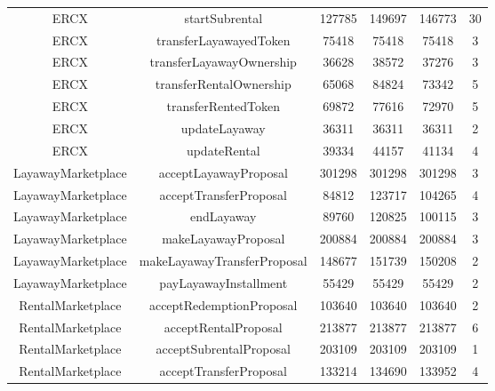 \documentclass[english, LaM, oneside]{sapthesis}%
\begin{document}
\begin{table}
\begin{adjustbox}{width=0.75\textwidth}
\begin{tabular}{@{}cccccc@{}}
ERCX               & startSubrental               & 127785       & 149697       & 146773       & 30               \\
ERCX               & transferLayawayedToken       & 75418        & 75418        & 75418        & 3                \\
ERCX               & transferLayawayOwnership     & 36628        & 38572        & 37276        & 3                \\
ERCX               & transferRentalOwnership      & 65068        & 84824        & 73342        & 5                \\
ERCX               & transferRentedToken          & 69872        & 77616        & 72970        & 5                \\
ERCX               & updateLayaway                & 36311        & 36311        & 36311        & 2                \\
ERCX               & updateRental                 & 39334        & 44157        & 41134        & 4                \\
LayawayMarketplace & acceptLayawayProposal        & 301298       & 301298       & 301298       & 3                \\
LayawayMarketplace & acceptTransferProposal       & 84812        & 123717       & 104265       & 4                \\
LayawayMarketplace & endLayaway                   & 89760        & 120825       & 100115       & 3                \\
LayawayMarketplace & makeLayawayProposal          & 200884       & 200884       & 200884       & 3                \\
LayawayMarketplace & makeLayawayTransferProposal  & 148677       & 151739       & 150208       & 2                \\
LayawayMarketplace & payLayawayInstallment        & 55429        & 55429        & 55429        & 2                \\
RentalMarketplace  & acceptRedemptionProposal     & 103640       & 103640       & 103640       & 2                \\
RentalMarketplace  & acceptRentalProposal         & 213877       & 213877       & 213877       & 6                \\
RentalMarketplace  & acceptSubrentalProposal      & 203109       & 203109       & 203109       & 1                \\
RentalMarketplace  & acceptTransferProposal       & 133214       & 134690       & 133952       & 4                \\

\end{tabular}
\end{adjustbox}
\end{table}
\end{document}
